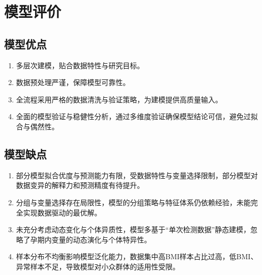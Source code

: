 \documentclass[withoutpreface,bwprint]{cumcmthesis} %
\begin{document}
\section{模型评价}
\subsection{模型优点}

\begin{enumerate}
    \item 多层次建模，贴合数据特性与研究目标。
    \item 数据预处理严谨，保障模型可靠性。
    \item 全流程采用严格的数据清洗与验证策略，为建模提供高质量输入。
    \item 全面的模型验证与稳健性分析，通过多维度验证确保模型结论可信，避免过拟合与偶然性。
\end{enumerate}

\subsection{模型缺点}
\begin{enumerate}
    \item 部分模型拟合优度与预测能力有限，受数据特性与变量选择限制，部分模型对数据变异的解释力和预测精度有待提升。
    \item 分组与变量选择存在局限性，模型的分组策略与特征体系仍依赖经验，未能完全实现数据驱动的最优解。
    \item 未充分考虑动态变化与个体异质性，模型多基于“单次检测数据”静态建模，忽略了孕期内变量的动态演化与个体特异性。
    \item 样本分布不均衡影响模型泛化能力，数据集中高BMI样本占比过高，低BMI、异常样本不足，导致模型对小众群体的适用性受限。
\end{enumerate}




\end{document}
